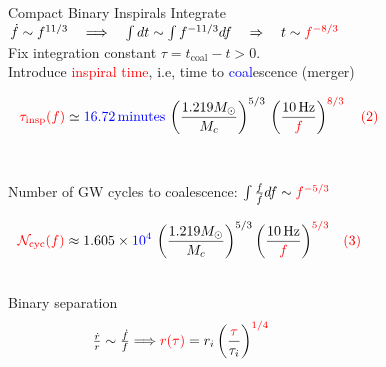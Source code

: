 \documentclass[xcolor=dvipsnames,t]{beamer}
\newcommand{\red}[1]{\textcolor{red}{#1}}
\newcommand{\bl}[1]{\textcolor{blue}{#1}}
\newcommand{\f}{\frac}
\newcommand{\nn}{\nonumber}
\begin{document}
\begin{frame}{Compact Binary Inspirals}
  \vspace{-3mm}
  Integrate $\dot{f} \sim f^{11/3} \quad \Longrightarrow \quad \int dt \sim \int f^{-11/3}df \quad\Rightarrow\quad t \sim \red{f^{-8/3}}$
  \\
  \vspace{1mm}
  Fix integration constant $\tau = t_\text{coal} - t >0$. \\
  \vspace{2mm}
  Introduce \red{inspiral time}, i.e, time to \bl{coal}escence (merger)
  \begin{small}
  \begin{align}
  \red{\tau_\text{insp}(f)} %
  &\simeq \bl{16.72\,\text{minutes}} \, \left(\f{1.219 M_\odot}{M_c}\right)^{5/3}\,{\left(\f{10\,\text{Hz}}{\red{f}}\right)^{\red{8/3}}\quad \red{(2)}}\nn\hspace{2.7cm}
  \end{align}
  \end{small}
  \\
  {
    Number of GW cycles to coalescence: $\int \tfrac{f}{\dot{f}}df\sim \red{f^{-5/3}}$ %
    \begin{small}
    \begin{align}
    \red{\mathcal{N}_\text{cyc}(f)} %
    &\approx 1.605\times \bl{10^4}\,\left(\f{1.219 M_\odot}{M_c}\right)^{5/3}{ \left(\f{10\,\text{Hz}}{\red{f}} \right)^{\red{5/3}}}\quad \red{(3)}\nn\hspace{3.2cm}
    \end{align}
    \end{small}
  }
      \\
    Binary separation \\
    \vspace{-1mm}
    \[ 
    \tfrac{\dot{r}}{r}\sim \tfrac{\dot{f}}{f} \Longrightarrow \red{r(\tau)}=r_i \left(\f{\red{\tau}}{\tau_i}\right)^{\red{1/4}} \hspace{4cm}
    \]
\end{frame}
\end{document}
